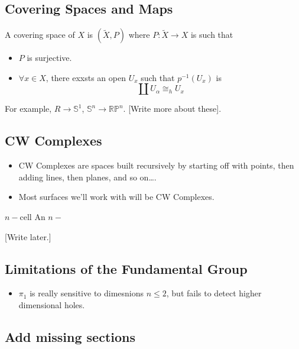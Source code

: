 \documentclass{article}
\begin{document}
\vskip 1cm
\subsection{Covering Spaces and Maps}

\begin{mathdefinitionbox}{}
  A covering space of $X$ is $(\tilde{X}, P)$ where $P : \tilde{X} \rightarrow X$ is such that 
  \begin{itemize}
    \item $P$ is surjective.
    \item $\forall x \in X$, there exxsts an open $U_x$ such that $p^{-1}(U_x)$ is 
    \[ \coprod U_{\alpha} \cong_{h} U_x \]
  \end{itemize}
\end{mathdefinitionbox}

For example, $R \rightarrow \mathbb{S}^1$, $\mathbb{S}^n \rightarrow \mathbb{RP}^n$.
[Write more about these].

\vskip 1cm
\subsection{CW Complexes}

\begin{itemize}
  \item CW Complexes are spaces built recursively by starting off with points, then adding lines, then planes, and so on\dots.
  
  \item Most surfaces we'll work with will be CW Complexes.
\end{itemize}

\begin{mathdefinitionbox}{$n-$cell}
   \vskip 0.25cm
   An $n-$
\end{mathdefinitionbox}

[Write later.]

\subsection{Limitations of the Fundamental Group}
\begin{itemize}
  \item $\pi_1$ is really sensitive to dimesnions $n \leq 2$, but fails to detect higher dimensional holes.
\end{itemize}

\subsection*{Add missing sections}
\end{document}
